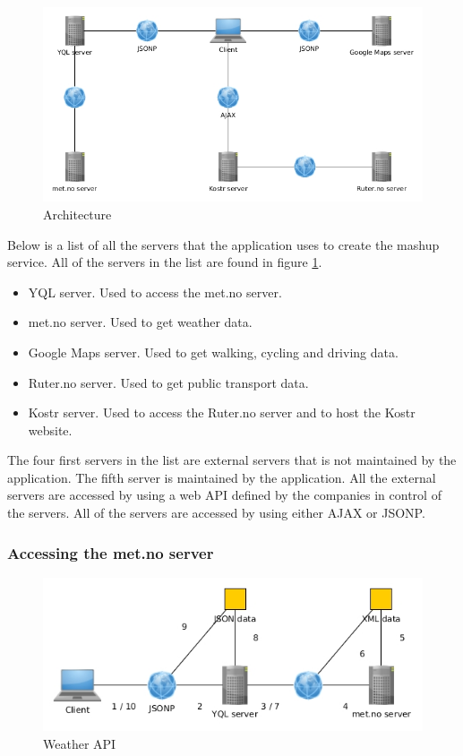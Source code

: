 \documentclass[10pt,a4paper]{article}
\begin{document}
\begin{figure}
\centering
\includegraphics[width=\textwidth]{../arch/arch}
\caption{Architecture}
\label{fig:arch}
\end{figure}

Below is a list of all the servers that the application uses to create the mashup service. All of the servers in the list are found in figure \ref{fig:arch}.

\begin{itemize}
\item YQL server. Used to access the met.no server.\cite{yql}
\item met.no server. Used to get weather data.\cite{metno}
\item Google Maps server. Used to get walking, cycling and driving data.\cite{gmaps}
\item Ruter.no server. Used to get public transport data.\cite{ruter}
\item Kostr server. Used to access the Ruter.no server and to host the Kostr website.
\end{itemize}

The four first servers in the list are external servers that is not maintained by the application. The fifth server is maintained by the application. All the external servers are accessed by using a web API defined by the companies in control of the servers. All of the servers are accessed by using either AJAX or JSONP.

\subsubsection{Accessing the met.no server}
\label{sec:access-weath-api}
\begin{figure}
\centering
\includegraphics[width=\textwidth]{../weather/access}

\caption{Weather API}
\label{fig:weather}
\end{figure}
\end{document}
